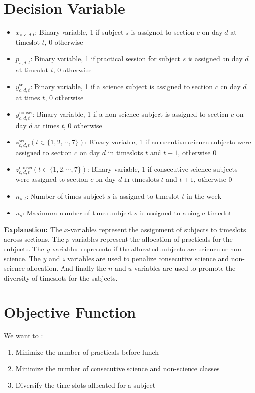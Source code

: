\documentclass[11pt]{article}
\begin{document}
\section*{Decision Variable}
\begin{itemize}
    \item $x_{s,c,d,t}$: Binary variable, 1 if subject \(s\) is assigned to section \(c\) on day \(d\) at timeslot \(t\), 0 otherwise
    \item $p_{s,d,t}$: Binary variable, 1 if practical session for subject \(s\) is assigned on day \(d\) at timeslot \(t\), 0 otherwise
    \item $y_{c,d,t}^{\text{sci}}$: Binary variable, 1 if a science subject is assigned to section \(c\) on day \(d\) at times \(t\), 0 otherwise
    \item $y_{c,d,t}^{\text{nonsci}}$: Binary variable, 1 if a non-science subject is assigned to section \(c\) on day \(d\) at times \(t\), 0 otherwise
    \item $z_{c,d,t}^{\text{sci}} (t \in \{1,2,\cdots,7\})$: Binary variable, 1 if consecutive science subjects were assigned to section \(c\) on day \(d\) in timeslots \(t\) and \(t+1\), otherwise 0
    \item $z_{c,d,t}^{\text{nonsci}} (t \in \{1,2,\cdots,7\})$: Binary variable, 1 if consecutive science subjects were assigned to section \(c\) on day \(d\) in timeslots \(t\) and \(t+1\), otherwise 0
    \item $n_{s,t}$: Number of times subject \(s\) is assigned to timeslot \(t\) in the week
    \item $u_{s}$: Maximum number of times subject \(s\) is assigned to a single timeslot
\end{itemize}
\textbf{Explanation:} The \(x\)-variables represent the assignment of subjects to timeslots across sections. The \(p\)-variables represent the allocation of practicals for the subjects. The \(y\)-variables represents if the allocated subjects are science or non-science. The \(y\) and \(z\) variables are used to penalize consecutive science and non-science allocation. And finally the \(n\) and \(u\) variables are used to promote the diversity of timeslots for the subjects.

\section*{Objective Function}
We want to :
\begin{enumerate}
    \item Minimize the number of practicals before lunch
    \item Minimize the number of consecutive science and non-science classes
    \item Diversify the time slots allocated for a subject
\end{enumerate}
\end{document}
